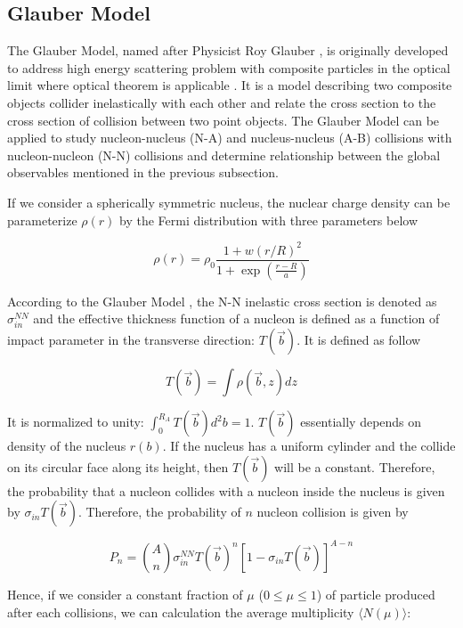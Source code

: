 \subsection{Glauber Model}

The Glauber Model, named after Physicist Roy Glauber \cite{Glauber}, is originally developed to address high energy scattering problem with composite particles in the optical limit where optical theorem is applicable \cite{Optical1,Optical2}. It is a model describing two composite objects collider inelastically with each other and relate the cross section to the cross section of collision between two point objects. The Glauber Model can be applied to study nucleon-nucleus (N-A) and nucleus-nucleus (A-B) collisions with nucleon-nucleon (N-N) collisions and determine relationship between the global observables mentioned in the previous subsection.    

 If we consider a spherically symmetric nucleus, the nuclear charge density can be parameterize $\rho(r)$ by the Fermi distribution with three parameters below

\begin{equation}
\rho(r) = \rho_0 \frac{1 + w(r/R)^2}{1 + \exp({\frac{r-R}{a}})}
\end{equation}

According to the Glauber Model \cite{Glauber}, the N-N inelastic cross section is denoted as $\sigma_{in}^{NN}$ and the effective thickness function of a nucleon is defined as a function of impact parameter in the transverse direction: $T(\vec{b})$. It is defined as follow

\begin{equation}
T(\vec{b}) =  \int \rho(\vec{b},z) dz 
\end{equation}

It is normalized to unity: $\int^{R_A}_0 T(\vec{b}) d^2b = 1$. $T(\vec{b})$ essentially depends on density of the nucleus $r(b)$. If the nucleus has a uniform cylinder and the collide on its circular face along its height, then $T(\vec{b})$ will be a constant. Therefore, the probability that a nucleon collides with a nucleon inside the nucleus is given by $\sigma_{in} T(\vec{b})$. Therefore, the probability of $n$ nucleon collision is given by

\begin{equation}
P_n = {A \choose n} \sigma_{in}^{NN} T(\vec{b})^{n} [1 - \sigma_{in} T(\vec{b})]^{A-n}
\end{equation}

Hence, if we consider a constant fraction of $\mu$ ($0 \le \mu \le 1$) of particle produced after each collisions, we can calculation the average multiplicity $\langle N(\mu) \rangle$:

